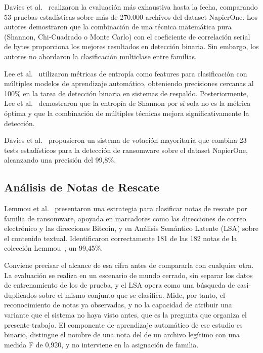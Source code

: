 Davies et al.~\cite{paper_4_comparison_of_entropy} realizaron la evaluación más exhaustiva hasta la fecha, comparando 53 pruebas estadísticas sobre más de 270.000 archivos del dataset NapierOne. Los autores demostraron que la combinación de una técnica matemática pura (Shannon, Chi-Cuadrado o Monte Carlo) con el coeficiente de correlación serial de bytes proporciona los mejores resultados en detección binaria. Sin embargo, los autores no abordaron la clasificación multiclase entre familias.

Lee et al.~\cite{paper_9_backups} utilizaron métricas de entropía como features para clasificación con múltiples modelos de aprendizaje automático, obteniendo precisiones cercanas al 100\% en la tarea de detección binaria en sistemas de respaldo. Posteriormente, Lee et al.~\cite{lee2022} demostraron que la entropía de Shannon por sí sola no es la métrica óptima y que la combinación de múltiples técnicas mejora significativamente la detección.

Davies et al.~\cite{paper_6_majority} propusieron un sistema de votación mayoritaria que combina 23 tests estadísticos para la detección de ransomware sobre el dataset NapierOne, alcanzando una precisión del 99,8\%.

\subsection{Análisis de Notas de Rescate}

Lemmou et al.~\cite{paper_5_note_files} presentaron una estrategia para clasificar notas de rescate por familia de ransomware, apoyada en marcadores como las direcciones de correo electrónico y las direcciones Bitcoin, y en Análisis Semántico Latente (LSA) sobre el contenido textual. Identificaron correctamente 181 de las 182 notas de la colección Lemmou~\cite{paper_5_dataset}, un 99,45\%.

Conviene precisar el alcance de esa cifra antes de compararla con cualquier otra. La evaluación se realiza en un escenario de mundo cerrado, sin separar los datos de entrenamiento de los de prueba, y el LSA opera como una búsqueda de casi-duplicados sobre el mismo conjunto que se clasifica. Mide, por tanto, el reconocimiento de notas ya observadas, y no la capacidad de atribuir una variante que el sistema no haya visto antes, que es la pregunta que organiza el presente trabajo. El componente de aprendizaje automático de ese estudio es binario, distingue el nombre de una nota del de un archivo legítimo con una medida F de 0,920, y no interviene en la asignación de familia.

